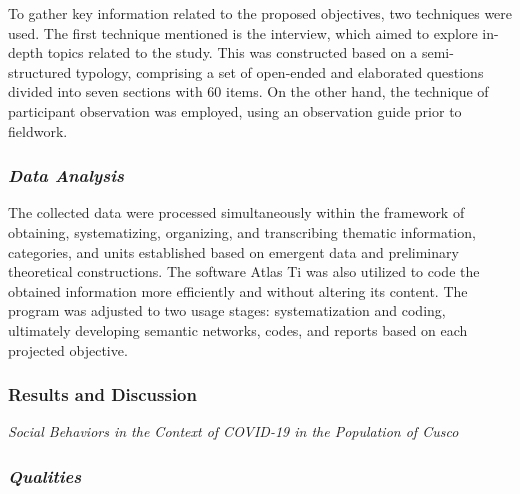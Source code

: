 \documentclass{article}
\begin{document}
To gather key information related to the proposed objectives, two techniques were used. The first technique mentioned is the interview, which aimed to explore in-depth topics related to the study. This was constructed based on a semi-structured typology, comprising a set of open-ended and elaborated questions divided into seven sections with 60 items. On the other hand, the technique of participant observation was employed, using an observation guide prior to fieldwork.

\subsubsection{\textit{Data Analysis}}

The collected data were processed simultaneously within the framework of obtaining, systematizing, organizing, and transcribing thematic information, categories, and units established based on emergent data and preliminary theoretical constructions. The software Atlas Ti was also utilized to code the obtained information more efficiently and without altering its content. The program was adjusted to two usage stages: systematization and coding, ultimately developing semantic networks, codes, and reports based on each projected objective.

\subsubsection{\textbf{Results and Discussion}}

\textit{Social Behaviors in the Context of COVID-19 in the Population of Cusco}

\subsubsection{\textit{Qualities}}
\end{document}
